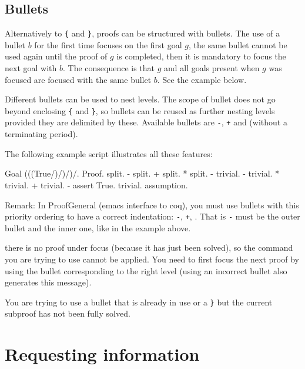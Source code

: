 \subsection[Bullets]{Bullets}
Alternatively to {\tt \{} and {\tt \}}, proofs can be structured with
bullets. The use of a bullet $b$ for the first time focuses on the
first goal $g$, the same bullet cannot be used again until the proof
of $g$ is completed, then it is mandatory to focus the next goal with $b$. The
consequence is that $g$ and all goals present when $g$ was focused are
focused with the same bullet $b$. See the example below.

Different bullets can be used to nest levels. The scope of bullet does
not go beyond enclosing {\tt \{} and {\tt \}}, so bullets can be
reused as further nesting levels provided they are delimited by these.
Available bullets are {\tt -}, {\tt +} and {\tt *} (without a
terminating period).

The following example script illustrates all these features:
\begin{coq_example*}
Goal (((True/\True)/\True)/\True)/\True.
Proof.
  split.
  - split.
    + split.
      * { split.
          - trivial.
          - trivial.
        }
      * trivial.
    + trivial.
  - assert True.
    { trivial. }
    assumption.
\end{coq_example*}

Remark: In ProofGeneral (emacs interface to coq), you must use bullets
with this priority ordering to have a correct indentation: {\tt -},
{\tt +}, {\tt *}. That is {\tt -} must be the outer bullet and {\tt *}
the inner one, like in the example above.

\begin{ErrMsgs}
\item {} there is no proof
      under focus (because it has just been solved), so the command
      you are trying to use cannot be applied. You need to first focus
      the next proof by using the bullet corresponding to the right
      level (using an incorrect bullet also generates this message).
\item {}
  You are trying to use a bullet that is already in use or a {\tt \}} but the current
  subproof has not been fully solved.
\end{ErrMsgs}


\section{Requesting information}

